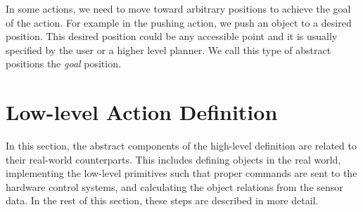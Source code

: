 In some actions, we need to move toward arbitrary positions to achieve the goal of the action.
For example in the pushing action, we push an object to a desired position.
This desired position could be any accessible point and it is usually specified by the user or a higher level planner.
We call this type of abstract positions the \textit{goal} position.
% 
% 
\section{Low-level Action Definition}
\label{sec:low-level}
In this section, the abstract components of the high-level definition are related to their real-world counterparts.
This includes defining objects in the real world, implementing the low-level primitives such that proper commands are sent to the hardware control systems,
and calculating the object relations from the sensor data.
In the rest of this section, these steps are described in more detail.

